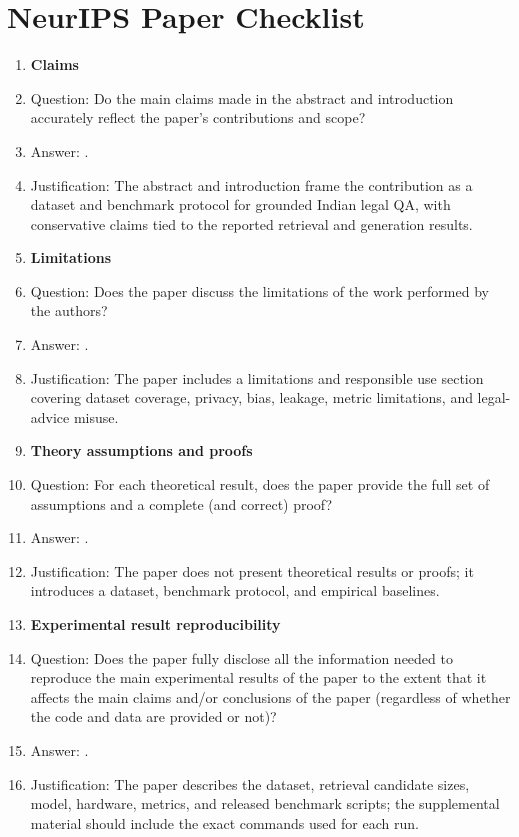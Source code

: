 \section*{NeurIPS Paper Checklist}

\begin{enumerate}

\item {\bf Claims}
    \item[] Question: Do the main claims made in the abstract and introduction accurately reflect the paper's contributions and scope?
    \item[] Answer: \answerYes{}.
    \item[] Justification: The abstract and introduction frame the contribution as a dataset and benchmark protocol for grounded Indian legal QA, with conservative claims tied to the reported retrieval and generation results.

\item {\bf Limitations}
    \item[] Question: Does the paper discuss the limitations of the work performed by the authors?
    \item[] Answer: \answerYes{}.
    \item[] Justification: The paper includes a limitations and responsible use section covering dataset coverage, privacy, bias, leakage, metric limitations, and legal-advice misuse.

\item {\bf Theory assumptions and proofs}
    \item[] Question: For each theoretical result, does the paper provide the full set of assumptions and a complete (and correct) proof?
    \item[] Answer: \answerNA{}.
    \item[] Justification: The paper does not present theoretical results or proofs; it introduces a dataset, benchmark protocol, and empirical baselines.

\item {\bf Experimental result reproducibility}
    \item[] Question: Does the paper fully disclose all the information needed to reproduce the main experimental results of the paper to the extent that it affects the main claims and/or conclusions of the paper (regardless of whether the code and data are provided or not)?
    \item[] Answer: \answerYes{}.
    \item[] Justification: The paper describes the dataset, retrieval candidate sizes, model, hardware, metrics, and released benchmark scripts; the supplemental material should include the exact commands used for each run.


\end{enumerate}
